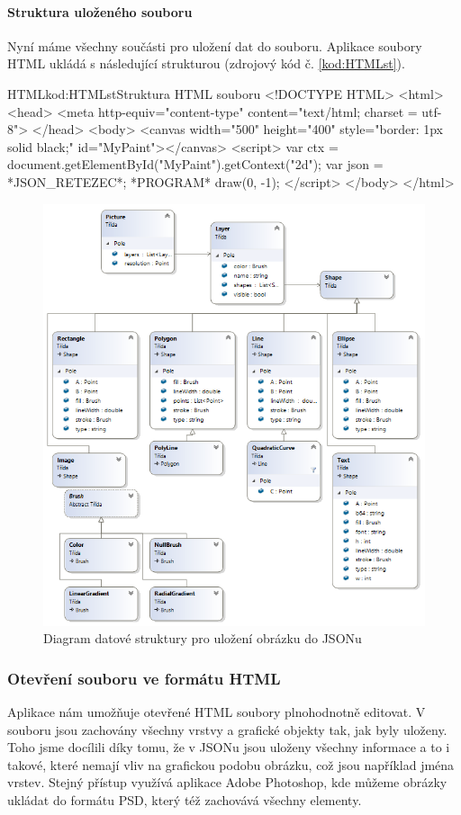 \documentclass[
  field=inf,
  biblatex,
  glossaries,
  index
]{kidiplom}
\begin{document}
\paragraph{Struktura uloženého souboru}
Nyní máme všechny součásti pro uložení dat do souboru. Aplikace soubory HTML ukládá s následující strukturou (zdrojový kód č. \ref{kod:HTMLst}).

\begin{kicode}{HTML}{kod:HTMLst}{Struktura HTML souboru}
<!DOCTYPE HTML>
<html>
  <head>
    <meta http-equiv="content-type" content="text/html; charset = utf-8">
  </head>
  <body>
  <canvas width="500" height="400" style="border: 1px solid black;" id="MyPaint"></canvas>
  <script>
    var ctx = document.getElementById("MyPaint").getContext("2d");
    var json = *JSON_RETEZEC*;
    *PROGRAM*
    draw(0, -1);
  </script>
  </body>
</html>
\end{kicode}


\begin{figure}
\includegraphics[width=15cm]{img/json_diag}
\caption{Diagram datové struktury pro uložení obrázku do JSONu}
\label{fig:json_diag}
\end{figure} 


\subsubsection{Otevření souboru ve formátu HTML}
Aplikace nám umožňuje otevřené HTML soubory plnohodnotně editovat. V souboru jsou zachovány všechny vrstvy a grafické objekty tak, jak byly uloženy. Toho jsme docílili díky tomu, že v JSONu jsou uloženy všechny informace a to i takové, které nemají vliv na grafickou podobu obrázku, což jsou například jména vrstev. Stejný přístup využívá aplikace Adobe Photoshop, kde můžeme obrázky ukládat do formátu PSD, který též zachovává všechny elementy.
\end{document}
